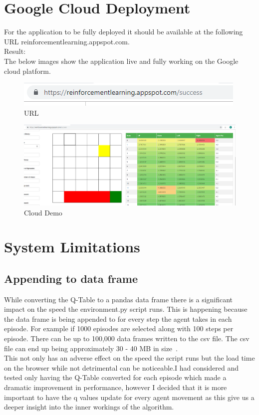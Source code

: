 \section{Google Cloud Deployment}
For the application to be fully deployed it should be available at the following URL reinforcementlearning.appspot.com.\\

Result:\\ The below images show the application live and fully working on the Google cloud platform.
\begin{figure}[H]
	\centering
	\includegraphics[width=0.7\linewidth]{img/cloudurl}
	\caption{URL}
	\label{fig:cloudurl}
\end{figure}
\begin{figure}[H]
	\centering
	\includegraphics[width=0.7\linewidth]{img/cloudFullPage}
	\caption{Cloud Demo}
	\label{fig:cloudfullpage}
\end{figure}

\section{System Limitations}
\subsection{Appending to data frame}
While converting the Q-Table to a pandas data frame there is a significant impact on the speed the environment.py script runs. This is happening because the data frame is being appended to for every step the agent takes in each episode. For example if 1000 episodes are selected along with 100 steps per episode. There can be up to 100,000 data frames written to the csv file. The csv file can end up being approximately 30 - 40 MB in size~\cite{pandasProblem:online}.\\ This not only has an adverse effect on the speed the script runs but the load time on the browser while not detrimental can be noticeable.I had considered and tested only having the Q-Table converted for each episode which made a dramatic improvement in performance, however I decided that it is more important to have the q values update for every agent movement as this give us a deeper insight into the inner workings of the algorithm.   

